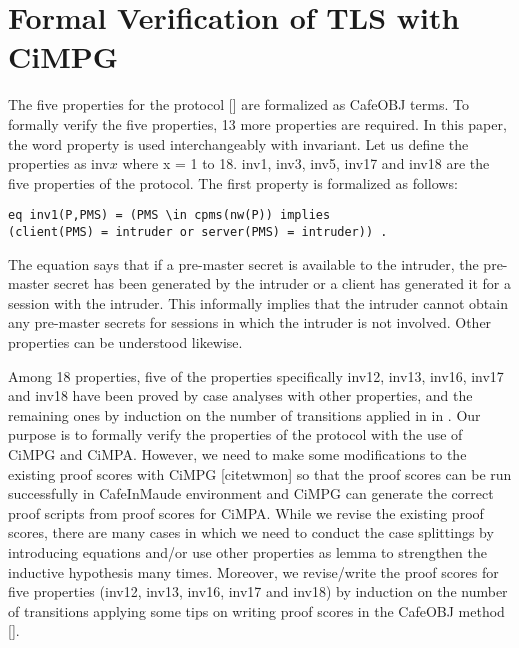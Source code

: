 \documentclass[a4paper,fleqn]{cas-dc}
\begin{document}
\section{Formal Verification of TLS with CiMPG}\label{fvtls}
The five properties for the protocol [\cite{1437139}] are formalized as CafeOBJ terms. To formally verify the five properties, 13 more properties are required. In this paper, the word property is used interchangeably with invariant. Let us define the properties as inv$x$ where x = 1 to 18. inv1, inv3, inv5, inv17 and inv18 are the five properties of the protocol. The first property is formalized as follows: 
\begin{small}
\begin{verbatim}
eq inv1(P,PMS) = (PMS \in cpms(nw(P)) implies 
(client(PMS) = intruder or server(PMS) = intruder)) .
\end{verbatim}
\end{small}
The equation says that if a pre-master secret is available to the intruder, the pre-master secret has been generated by the intruder or a client has generated it for a session with the intruder. This informally implies that the intruder cannot obtain any pre-master secrets for sessions in which the intruder is not involved. Other properties can be understood likewise.

Among 18 properties, five of the properties specifically inv12, inv13, inv16, inv17 and inv18 have been proved by case analyses with other properties, and the remaining ones by induction on the number of transitions applied in in \cite{1437139}. Our purpose is to formally verify the properties of the protocol with the use of CiMPG and CiMPA.
However, we need to make some modifications to the existing proof scores with CiMPG [cite{twmon}] so that the proof scores can be run successfully in CafeInMaude environment and CiMPG can generate the correct proof scripts from proof scores for CiMPA. While we revise the existing proof scores, there are many cases in which we need to conduct the case splittings by introducing equations and/or use other properties as lemma to strengthen the inductive hypothesis many times. Moreover, we revise/write the proof scores for five properties (inv12, inv13, inv16, inv17 and inv18) by induction on the number of transitions applying some tips on writing proof scores in the CafeOBJ method [\cite{Ogata2006}].
\end{document}
